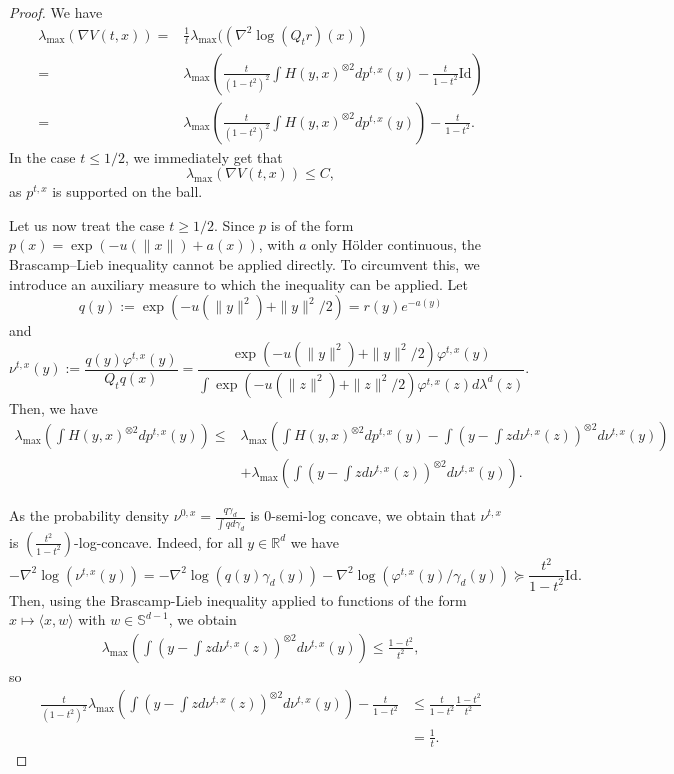 \documentclass{article}
\begin{document}
\begin{proof}
 We have 
\begin{align}\label{eq:vubifvhd}
        \lambda_{\max}(\nabla V(t,x)) = &\frac{1}{t}\lambda_{\max}((\nabla^2 \log(Q_t r)(x))\nonumber\\
=&\lambda_{\max}\left(\frac{t}{(1-t^2)^2}\int H(y,x)^{\otimes 2} dp^{t,x}(y)-\frac{t}{1-t^2}\text{Id}\right)\nonumber\\
=&\lambda_{\max}\left(\frac{t}{(1-t^2)^2}\int H(y,x)^{\otimes 2} dp^{t,x}(y)\right)-\frac{t}{1-t^2}.
\end{align}
In the case $t\leq 1/2$, we immediately get that
$$\lambda_{\max}(\nabla V(t,x))\leq C,$$
as $p^{t,x}$ is supported on the ball. 

Let us now treat the case $t\geq 1/2.$ Since \( p \) is of the form \( p(x) = \exp(-u(\|x\|) + a(x)) \), with \( a \) only Hölder continuous, the Brascamp--Lieb inequality cannot be applied directly.
 To circumvent this, we introduce an auxiliary measure to which the inequality can be applied.
Let
$$q(y):=\exp(-u(\|y\|^2)+\|y\|^2/2)=r(y)e^{-a(y)}$$
and
$$\nu^{t,x}(y) :=\frac{q(y)\varphi^{t,x}(y)}{Q_tq(x)}=\frac{\exp(-u(\|y\|^2)+\|y\|^2/2)\varphi^{t,x}(y)}{\int \exp(-u(\|z\|^2)+\|z\|^2/2)\varphi^{t,x}(z)d\lambda^d(z)}.$$
Then, we have 
\begin{align}\label{align:vfdihsksgs}
\lambda_{\max}\left(\int H(y,x)^{\otimes 2} dp^{t,x}(y)\right)\leq &\lambda_{\max}\left(\int H(y,x)^{\otimes 2} dp^{t,x}(y)-\int\left(y-\int zd\nu^{t,x}(z)\right)^{\otimes 2}d\nu^{t,x}(y)\right)\nonumber\\
&+ \lambda_{\max}\left(\int\left(y-\int zd\nu^{t,x}(z)\right)^{\otimes 2}d\nu^{t,x}(y)\right).
\end{align}

As the probability density $\nu^{0,x}=\frac{q\gamma_d}{\int qd\gamma_d}$  is $0$-semi-log concave, we obtain that 
 $\nu^{t,x}$ is $\left(\frac{t^2}{1-t^2}\right)$-log-concave.
Indeed, for all $y\in \mathbb{R}^d$ we have
\begin{equation}\label{eq:ptxislogconc}
-\nabla^2\log(\nu^{t,x}(y))=-\nabla^2\log(q(y)\gamma_d(y))-\nabla^2\log(\varphi^{t,x}(y)/\gamma_d(y))\succeq \frac{t^2}{1-t^2} \text{Id}.
\end{equation}
Then, using the Brascamp-Lieb inequality applied to functions of the form $x\mapsto \langle x,w\rangle $ with $w\in \mathbb{S}^{d-1}$, we obtain
\begin{align*}
    \lambda_{\max}\left(\int \left(y-\int z d\nu^{t,x}(z)\right)^{\otimes2} d\nu^{t,x}(y)\right)\leq \frac{1-t^2}{t^2},
\end{align*}
so
\begin{align*}  \frac{t}{(1-t^2)^2}\lambda_{\max}\left(\int \left(y-\int z d\nu^{t,x}(z)\right)^{\otimes2} d\nu^{t,x}(y)\right)-\frac{t}{1-t^2}&\leq \frac{t}{1-t^2} \frac{1-t^2}{t^2}\\
& = \frac{1}{t}.
\end{align*}


\end{proof}
\end{document}
